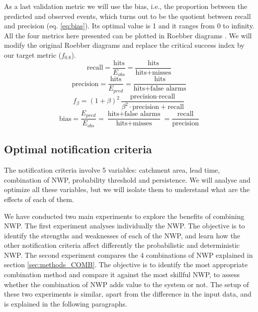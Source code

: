 \documentclass[preprint,12pt]{elsarticle}
\begin{document}
As a last validation metric we will use the bias, i.e., the proportion between the predicted and observed events, which turns out to be the quotient between recall and precision (eq. \ref{eq:bias}). Its optimal value is 1 and it ranges from 0 to infinity. All the four metrics here presented can be plotted in Roebber diagrams \cite{Roebber2009}. We will modify the original Roebber diagrams and replace the critical success index by our target metric ($f_{0.8}$).
\begin{equation}
    \text{recall} = \frac{\text{hits}}{E_{obs}} = \frac{\text{hits}}{\text{hits} + \text{misses}}
    \label{eq:recall}
\end{equation}
\begin{equation}
    \text{precision} = \frac{\text{hits}}{E_{pred}} = \frac{\text{hits}}{\text{hits} + \text{false alarms}}
    \label{eq:precision}
\end{equation}
\begin{equation}
    f_{\beta} = \left( 1 + \beta \right)^2 \frac{\text{precision} \cdot \text{recall}}{\beta^2 \cdot \text{precision} + \text{recall}}
    \label{eq:fscore}
\end{equation}
\begin{equation}
    \text{bias} = \frac{E_{pred}}{E_{obs}} = \frac{\text{hits} + \text{false alarms}} {\text{hits} + \text{misses}} = \frac{\text{recall}}{\text{precision}}
    \label{eq:bias}
\end{equation}

\subsection{Optimal notification criteria}
\label{sec:methods_OPT}

The notification criteria involve 5 variables: catchment area, lead time, combination of NWP, probability threshold and persistence. We will analyse and optimize all these variables, but we will isolate them to understand what are the effects of each of them.

We have conducted two main experiments to explore the benefits of combining NWP. The first experiment analyses individually the NWP. The objective is to identify the strengths and weaknesses of each of the NWP, and learn how the other notification criteria affect differently the probabilistic and deterministic NWP. The second experiment compares the 4 combinations of NWP explained in section \ref{sec:methods_COMB}. The objective is to identify the most appropriate combination method and compare it against the most skillful NWP, to assess whether the combination of NWP adds value to the system or not. The setup of these two experiments is similar, apart from the difference in the input data, and is explained in the following paragraphs.
\end{document}
